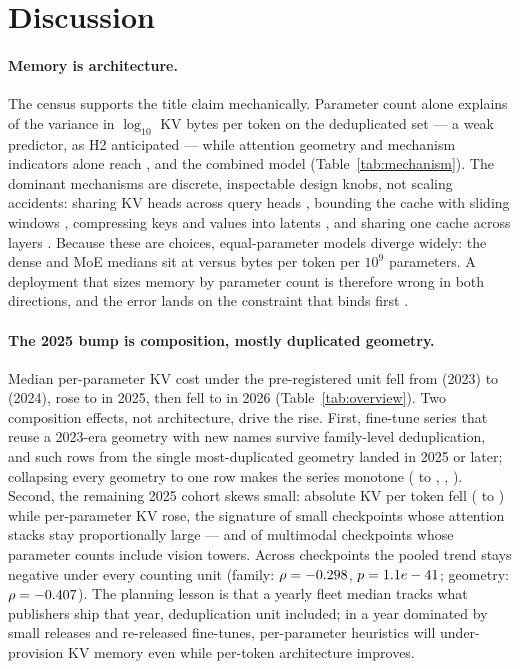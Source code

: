 \section{Discussion}\label{sec:discussion}

\paragraph{Memory is architecture.}
The census supports the title claim mechanically. Parameter count alone explains
\kvcParRsq{} of the variance in $\log_{10}$ KV bytes per token on the deduplicated
set --- a weak predictor, as H2 anticipated --- while attention geometry and
mechanism indicators alone reach \kvcGeomRsq{}, and the combined model
\kvcFullRsq{} (Table~\ref{tab:mechanism}). The
dominant mechanisms are discrete, inspectable design knobs, not scaling
accidents: sharing KV heads across query heads
\cite{shazeer2019mqa,ainslie2023gqa}, bounding the cache with sliding windows
\cite{xiao2023streamingllm,jiang2023mistral}, compressing keys and values into
latents \cite{deepseekai2024v2}, and sharing one cache across layers
\cite{sun2024yoco,wu2024cla}. Because these are choices, equal-parameter models
diverge widely: the dense and MoE medians sit at \kvcMedKvppDense{} versus
\kvcMedKvppMoe{} bytes per token per $10^9$ parameters. A deployment that sizes
memory by parameter count is therefore wrong in both directions, and the error
lands on the constraint that binds first \cite{kwon2023paged}.

\paragraph{The 2025 bump is composition, mostly duplicated geometry.}
Median per-parameter KV cost under the pre-registered unit fell from
\kvcMedianKvppTwentyThree{} (2023) to \kvcMedianKvppTwentyFour{} (2024), rose to
\kvcMedianKvppTwentyFive{} in 2025, then fell to \kvcMedianKvppTwentySix{} in 2026
(Table~\ref{tab:overview}). Two composition effects, not architecture, drive the rise.
First, fine-tune series that reuse a 2023-era geometry with new names survive
family-level deduplication, and \kvcWorstGeoClusterRecent{} such rows from the single
most-duplicated geometry landed in 2025 or later; collapsing every geometry to one row
makes the series monotone (\kvcMedianKvppGeoTwentyThree{} to
\kvcMedianKvppGeoTwentyFour, \kvcMedianKvppGeoTwentyFive,
\kvcMedianKvppGeoTwentySix). Second, the remaining 2025 cohort skews small: absolute KV
per token fell (\kvcMedianKvTokTwentyFour{} to \kvcMedianKvTokTwentyFive) while
per-parameter KV rose, the signature of small checkpoints whose attention stacks stay
proportionally large --- and of multimodal checkpoints whose parameter counts include
vision towers. Across checkpoints the pooled trend stays negative under every counting
unit (family: $\rho=-0.298$, $p=1.1e-41$; geometry:
$\rho=-0.407$). The planning lesson is that a yearly fleet median tracks
what publishers ship that year, deduplication unit included; in a year dominated by
small releases and re-released fine-tunes, per-parameter heuristics will under-provision
KV memory even while per-token architecture improves.

